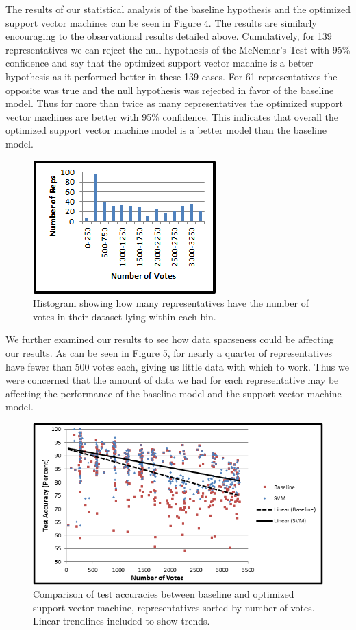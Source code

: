 \documentclass[11pt,letterpaper,twocolumn]{article}
\begin{document}
The results of our statistical analysis of the baseline hypothesis and the optimized support vector machines  can be seen in Figure 4. The results are similarly encouraging to the observational results detailed above. Cumulatively, for 139 representatives we can reject the null hypothesis of the McNemar's Test with 95\% confidence and say that the optimized support vector machine is a better hypothesis as it performed better in these 139 cases. For 61 representatives the opposite was true and the null hypothesis was rejected in favor of the baseline model. Thus for more than twice as many representatives the optimized support vector machines are better with 95\% confidence. This indicates that overall the optimized support vector machine model is a better model than the baseline model.

\begin{figure}
\centering
\includegraphics{data_distribution2.png}
\caption{Histogram showing how many representatives have the number of votes in their dataset lying within each bin.}
\end{figure}

We further examined our results to see how data sparseness could be affecting our results. As can be seen in Figure 5, for nearly a quarter of representatives have fewer than 500 votes each, giving us little data with which to work. Thus we were concerned that the amount of data we had for each representative may be affecting the performance of the baseline model and the support vector machine model.

\begin{figure}[t]
\centering
\includegraphics{size_accuracy2.png}
\caption{Comparison of test accuracies between baseline and optimized support vector machine, representatives sorted by number of votes. Linear trendlines included to show trends.}
\end{figure}
\end{document}

